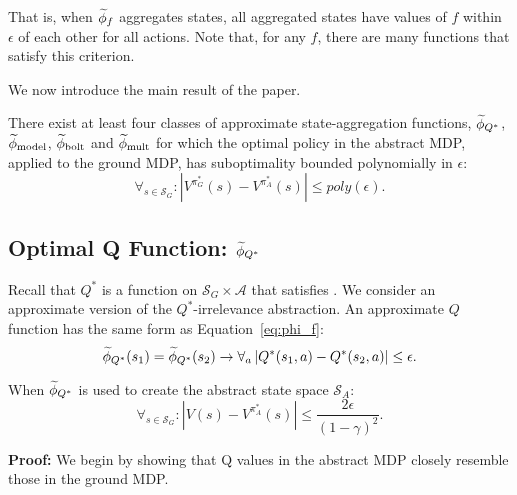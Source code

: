 That is, when $\widetilde \phi_f$ aggregates states, all aggregated states have values of $f$ within $\epsilon$ of each other for all actions. Note that, for any $f$, there are many functions that satisfy this criterion.

We now introduce the main result of the paper.

\begin{thm}
There exist at least four classes of approximate state-aggregation functions, $\widetilde \phi_{Q^*}$, $\widetilde \phi_{\text{model}}$, $\widetilde \phi_{\text{bolt}}$ and $\widetilde \phi_{\text{mult}}$ for which the optimal policy in the abstract \ac{MDP}, applied to the ground \ac{MDP}, has suboptimality bounded polynomially in $\epsilon$:
\begin{equation}
\forall_{s \in \mathcal{S}_G}: | V^{\pi^*_G}(s) - V^{\pi^*_{A}}(s) | \leq poly(\epsilon).
\end{equation}

\end{thm}


\subsection{Optimal Q Function: $\widetilde \phi_{Q^*}$}

Recall that $Q^*$ is a function on $\mathcal{S}_G \times \mathcal{A}$ that satisfies . We consider an approximate version of the $Q^*$-irrelevance abstraction. An approximate $Q$ function has the same form as Equation~\ref{eq:phi_f}:
\begin{equation}
\widetilde \phi_{Q^*}(s_1) = \widetilde \phi_{Q^*}(s_2) \rightarrow \forall_a \left|Q^*(s_1, a) - Q^*(s_2, a)\right| \leq \epsilon.
\end{equation}

\begin{lma}
\label{lma:Q*}
When $\widetilde \phi_{Q^*}$ is used to create the abstract state space $\mathcal{S}_A$:
\begin{equation}
\forall_{s \in \mathcal{S}_G}: | V(s) - V^{\pi^*_{A}}(s) | \leq \frac{2\epsilon}{(1-\gamma)^2}.
\end{equation}
\end{lma}

\textbf{Proof:}
We begin by showing that Q values in the abstract \ac{MDP} closely resemble those in the ground \ac{MDP}.

